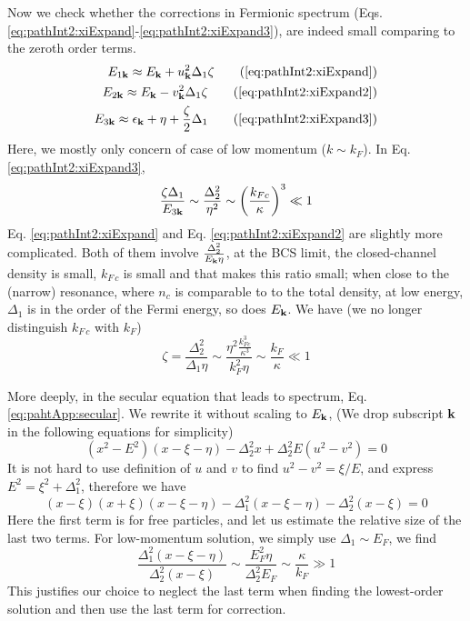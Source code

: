 Now we check whether the corrections in Fermionic spectrum (Eqs. \ref{eq:pathInt2:xiExpand}-\ref{eq:pathInt2:xiExpand3}), 
are indeed small comparing to the zeroth order terms.  
\begin{align}
E_{1\vk}\approx{}E_{\vk}+u_{\vk}^{2}\Delta_{1}\zeta\tag{\ref{eq:pathInt2:xiExpand}}\\
E_{2\vk}\approx{}E_{\vk}-v_{\vk}^{2}\Delta_{1}\zeta\tag{\ref{eq:pathInt2:xiExpand2}}\\
E_{3\vk}\approx{}\epsilon_{\vk}+\eta+\frac{\zeta}{2}\Delta_{1}
\tag{\ref{eq:pathInt2:xiExpand3}}
\end{align}
Here, we mostly only concern of case of low momentum ($k\sim{}k_{F}$).  In Eq. \ref{eq:pathInt2:xiExpand3}, 
\begin{equation*}
\frac{\zeta\Delta_{1}}{E_{3\mathbf{k}}}\sim{}\frac{\Delta_{2}^{2}}{\eta^{2}}\sim\left(\frac{k_{Fc}}{\kappa}\right)^{3}\ll1
\end{equation*}
Eq. \ref{eq:pathInt2:xiExpand} and Eq. \ref{eq:pathInt2:xiExpand2} are slightly more complicated.  Both of them involve $\frac{\Delta_{2}^{2}}{E_{\mathbf{k}}\eta}$,  at the  BCS limit, the closed-channel density is small, $k_{F\,c}$ is small and that makes this ratio small; when close to the (narrow) resonance, where $n_{c}$ is comparable to to the total density, at low energy, $\Delta_{1}$ is in the order of the Fermi energy, so does $E_{\mathbf{k}}$.   We have (we no longer distinguish $k_{F\,c}$ with $k_{F}$)
 \begin{equation}\label{eq:pathApp:zetaEs}
 \zeta=\frac{\Delta_{2}^{2}}{\Delta_{1}\eta}\sim\frac{\eta^{2}\frac{k_{Fc}^{3}}{\kappa^{3}}}{k_{F}^{2}\eta}\sim\frac{k_{F}}{\kappa}\ll1
\end{equation}

More deeply, in the secular equation that leads to spectrum, Eq. \ref{eq:pahtApp:secular}.  We rewrite it without scaling to $E_{\mathbf{k}}$,  (We drop subscript $\mathbf{k}$ in the following equations for simplicity)
\begin{equation*}
(x^{2}-E^{2})(x-\xi-\eta)-\Delta_{2}^{2}x+\Delta_{2}^{2}E(u^{2}-v^{2})=0
\end{equation*}
It is not hard to use definition of $u$ and $v$ to find $u^{2}-v^{2}=\xi/E$, and express $E^{2}=\xi^{2}+\Delta_{1}^{2}$, therefore we have
\begin{equation*}
(x-\xi)(x+\xi)(x-\xi-\eta)-\Delta_{1}^{2}(x-\xi-\eta)-\Delta_{2}^{2}(x-\xi)=0
\end{equation*}
Here the first term is for free particles, and let us estimate the relative size of the last two terms.  For low-momentum solution, we simply use $\Delta_{1}\sim{}E_{F}$, we find
\begin{equation*}
\frac{\Delta_{1}^{2}(x-\xi-\eta)}{\Delta_{2}^{2}(x-\xi)}\sim\frac{E_{F}^{2}\eta}{\Delta_{2}^{2}E_{F}}\sim\frac{\kappa}{k_{F}}\gg1
\end{equation*}
This justifies our choice to neglect the last term when finding the lowest-order solution and then use the last term for correction.  

